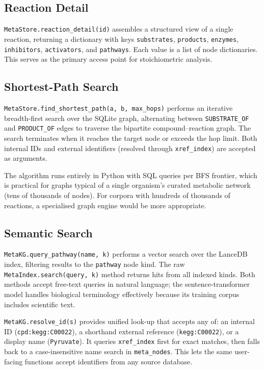 \documentclass[10pt]{article}
\begin{document}
\subsection{Reaction Detail}

\texttt{MetaStore.reaction\_detail(id)} assembles a structured view of a
single reaction, returning a dictionary with keys \texttt{substrates},
\texttt{products}, \texttt{enzymes}, \texttt{inhibitors}, \texttt{activators},
and \texttt{pathways}. Each value is a list of node dictionaries. This serves
as the primary access point for stoichiometric analysis.

\subsection{Shortest-Path Search}

\texttt{MetaStore.find\_shortest\_path(a, b, max\_hops)} performs an
iterative breadth-first search over the SQLite graph, alternating between
\texttt{SUBSTRATE\_OF} and \texttt{PRODUCT\_OF} edges to traverse the
bipartite compound--reaction graph. The search terminates when it reaches the
target node or exceeds the hop limit. Both internal IDs and external
identifiers (resolved through \texttt{xref\_index}) are accepted as
arguments.

The algorithm runs entirely in Python with SQL queries per BFS frontier,
which is practical for graphs typical of a single organism's curated metabolic
network (tens of thousands of nodes). For corpora with hundreds of thousands
of reactions, a specialised graph engine would be more appropriate.

\subsection{Semantic Search}

\texttt{MetaKG.query\_pathway(name, k)} performs a vector search over the
LanceDB index, filtering results to the \texttt{pathway} node kind. The raw
\texttt{MetaIndex.search(query, k)} method returns hits from all indexed
kinds. Both methods accept free-text queries in natural language; the
sentence-transformer model handles biological terminology effectively because
its training corpus includes scientific text.

\texttt{MetaKG.resolve\_id(s)} provides unified look-up that accepts any of:
an internal ID (\texttt{cpd:kegg:C00022}), a shorthand external reference
(\texttt{kegg:C00022}), or a display name (\texttt{Pyruvate}). It queries
\texttt{xref\_index} first for exact matches, then falls back to a
case-insensitive name search in \texttt{meta\_nodes}. This lets the same
user-facing functions accept identifiers from any source database.
\end{document}
